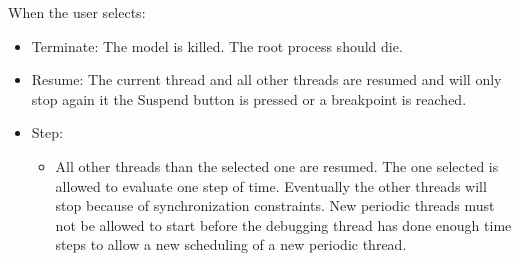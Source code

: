 \documentclass{overturerep}
\begin{document}
When the user selects:

\begin{itemize}
	\item Terminate: The model is killed. The root process should die.
	\item Resume: The current thread and all other threads are resumed and will only stop again it the Suspend button is pressed or a breakpoint is reached.
	\item Step:
\begin{itemize}
	\item All other threads than the selected one are resumed. The one selected is allowed to evaluate one step of time. Eventually the other threads will stop because of synchronization constraints. New periodic threads must not be allowed to start before the debugging thread has done enough time steps to allow a new scheduling of a new periodic thread.
\end{itemize}

\end{itemize}




\end{document}
